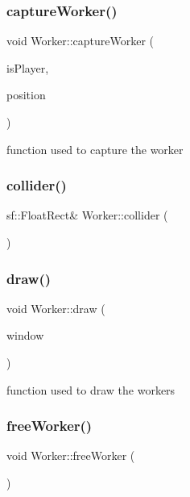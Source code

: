 \subsubsection{\texorpdfstring{captureWorker()}{captureWorker()}}
{\footnotesize\ttfamily void Worker\+::capture\+Worker (\begin{DoxyParamCaption}\item[{bool}]{is\+Player,  }\item[{\mbox{\hyperlink{class_vector2f}{Vector2f}} \&}]{position }\end{DoxyParamCaption})}

function used to capture the worker \mbox{\label{class_worker_a2b15396b9a09e43fc87efeea650d416a}} 
\subsubsection{\texorpdfstring{collider()}{collider()}}
{\footnotesize\ttfamily sf\+::\+Float\+Rect\& Worker\+::collider (\begin{DoxyParamCaption}{ }\end{DoxyParamCaption})\hspace{0.3cm}{\ttfamily [inline]}}

\mbox{\label{class_worker_a2724bde59b7eb0de17835e8cb836d9e4}} 
\subsubsection{\texorpdfstring{draw()}{draw()}}
{\footnotesize\ttfamily void Worker\+::draw (\begin{DoxyParamCaption}\item[{sf\+::\+Render\+Window \&}]{window }\end{DoxyParamCaption})}

function used to draw the workers \mbox{\label{class_worker_afdf9ffac28bf4e7f33664e453ac83738}} 
\subsubsection{\texorpdfstring{freeWorker()}{freeWorker()}}
{\footnotesize\ttfamily void Worker\+::free\+Worker (\begin{DoxyParamCaption}{ }\end{DoxyParamCaption})}

